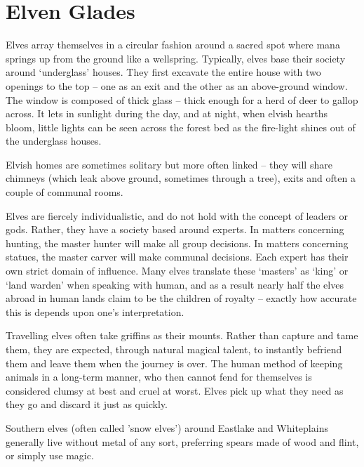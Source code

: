 \section[Elves]{Elven Glades \El}


\begin{multicols}{2}

\noindent
Elves array themselves in a circular fashion around a sacred spot where mana springs up from the ground like a wellspring.
Typically, elves base their society around `underglass' houses.
They first excavate the entire house with two openings to the top -- one as an exit and the other as an above-ground window.
The window is composed of thick glass -- thick enough for a herd of deer to gallop across.
It lets in sunlight during the day, and at night, when elvish hearths bloom, little lights can be seen across the forest bed as the fire-light shines out of the underglass houses.

Elvish homes are sometimes solitary but more often linked -- they will share chimneys (which leak above ground, sometimes through a tree), exits and often a couple of communal rooms.

Elves are fiercely individualistic, and do not hold with the concept of leaders or gods.
Rather, they have a society based around experts.
In matters concerning hunting, the master hunter will make all group decisions.
In matters concerning statues, the master carver will make communal decisions.
Each expert has their own strict domain of influence.
Many elves translate these `masters' as `king' or `land warden' when speaking with human, and as a result nearly half the elves abroad in human lands claim to be the children of royalty -- exactly how accurate this is depends upon one's interpretation.

Travelling elves often take griffins as their mounts. Rather than capture and tame them, they are expected, through natural magical talent, to instantly befriend them and leave them when the journey is over. The human method of keeping animals in a long-term manner, who then cannot fend for themselves is considered clumsy at best and cruel at worst. Elves pick up what they need as they go and discard it just as quickly.

Southern elves (often called 'snow elves') around Eastlake and Whiteplains generally live without metal of any sort, preferring spears made of wood and flint, or simply use magic.


\end{multicols}
